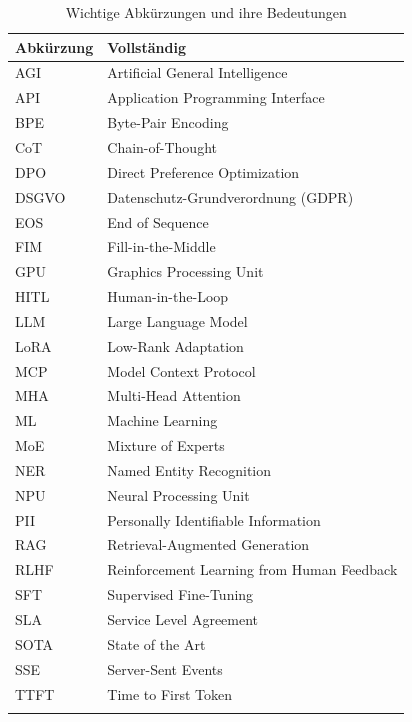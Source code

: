 \begin{longtable}{@{}p{2.5cm}p{\dimexpr\linewidth-2.5cm-2\tabcolsep}@{}}
\toprule
\textbf{Abkürzung} & \textbf{Vollständig} \\
\midrule
\endhead
AGI & Artificial General Intelligence \\
API & Application Programming Interface \\
BPE & Byte-Pair Encoding \\
CoT & Chain-of-Thought \\
DPO & Direct Preference Optimization \\
DSGVO & Datenschutz-Grundverordnung (GDPR) \\
EOS & End of Sequence \\
FIM & Fill-in-the-Middle \\
GPU & Graphics Processing Unit \\
HITL & Human-in-the-Loop \\
LLM & Large Language Model \\
LoRA & Low-Rank Adaptation \\
MCP & Model Context Protocol \\
MHA & Multi-Head Attention \\
ML & Machine Learning \\
MoE & Mixture of Experts \\
NER & Named Entity Recognition \\
NPU & Neural Processing Unit \\
PII & Personally Identifiable Information \\
RAG & Retrieval-Augmented Generation \\
RLHF & Reinforcement Learning from Human Feedback \\
SFT & Supervised Fine-Tuning \\
SLA & Service Level Agreement \\
SOTA & State of the Art \\
SSE & Server-Sent Events \\
TTFT & Time to First Token \\
\bottomrule
\caption{Wichtige Abkürzungen und ihre Bedeutungen}
\end{longtable}
\endinput
